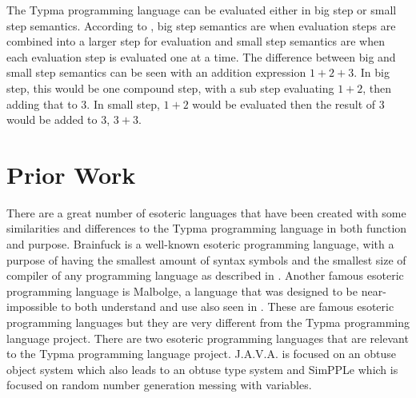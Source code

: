 \documentclass[10pt,twocolumn]{article}
\begin{document}
The Typma programming language can be evaluated either in big step or small step semantics. According to \textcite{CS4110IMP}, big step semantics are when evaluation steps are combined into a larger step for evaluation and small step semantics are when each evaluation step is evaluated one at a time. The difference between big and small step semantics can be seen with an addition expression $1 + 2 + 3$.
In big step, this would be one compound step, with a sub step evaluating $1 + 2$, then adding that to $3$.
In small step, $1 + 2$ would be evaluated then the result of $3$ would be added to $3$, $3 + 3$.

\section{Prior Work}

There are a great number of esoteric languages that have been created with some similarities and differences to the Typma programming language in both function and purpose. Brainfuck is a well-known esoteric programming
language,
with a purpose of having the smallest amount of syntax symbols and the smallest size of compiler of any programming language as described in \textcite{Morr2014Esoteric}. Another famous esoteric programming language is Malbolge, a language that was designed to be near-impossible to both understand and use also seen in \textcite{Morr2014Esoteric}.
These are famous esoteric programming languages but they are very different from the Typma programming language project. There are two esoteric programming languages that are relevant to the Typma programming language project. J.A.V.A. is focused on an obtuse object system which also leads to an obtuse type system and SimPPLe which is focused on random number generation messing with variables.
\end{document}
